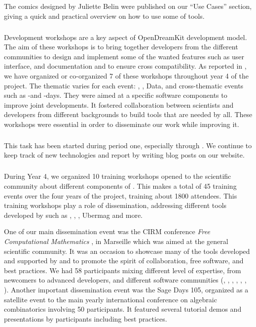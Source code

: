 The comics designed by Juliette Belin were published on our ``Use Cases'' section, giving a quick and practical overview on how to use some of \ODK tools.

\subparagraph{}
\label{dissem@devel-workshops}

Development workshops are a key aspect of OpenDreamKit development model. The aim of these workshops is to bring together developers from the different communities to design and implement some
of the wanted features such as user interface, and documentation and to ensure cross compatibility. 
As reported in , we have organized
or co-organized 7  of these workshops throughout year 4 of the project. The thematic varies
for each event: \PariGP, \Linbox, Data, and cross-thematic events such as \GAP-\Sage and \GAP-\Singular days. They were aimed at a specific software components to improve joint developments. It fostered collaboration between scientists and developers from different backgrounds to build tools that are needed by all. These workshops were essential in order to disseminate our work while improving it. 

\subparagraph{}

This task has been started during period one, especially through . We continue
to keep track of new technologies and report by writing blog posts on our website.


\subparagraph{}
\label{dissem@dissemination}


During Year 4, we organized 10 training workshops opened to the scientific community about different components of \ODK. This makes a total of 45 training events over the four years of the project, training about 1800 attendees. This training workshops play a role of dissemination, addressing different tools developed by \ODK such as \Sage, \Jupyter, \GAP, Ubermag and more.  

One of our main dissemination event was the CIRM conference \emph{Free Computational Mathematics} , in Marseille which was aimed at the general scientific community.  It was an occasion to showcase  many of the tools developed and supported by \ODK and to promote the spirit of collaboration, free software, and best practices. We had 58 participants mixing different level of expertise, from newcomers to advanced developers, and different software communities (\GAP, \Jupyter, \Linbox,  \MPIR, \PariGP, \Sage, \Singular). Another important dissemination event was the Sage Days 105, organized as a satellite event to the main yearly international conference  on algebraic combinatorics involving 50 participants. It featured several tutorial demos and presentations by \ODK participants including best practices. 

